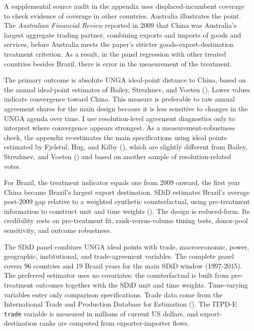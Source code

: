 \documentclass[
  12pt,
]{article}
\begin{document}
A supplemental source audit in the appendix uses displaced-incumbent coverage to check evidence of coverage in other countries. Australia illustrates the point. The \emph{Australian Financial Review} reported in 2009 that China was Australia's largest aggregate trading partner, combining exports and imports of goods and services, before Australia meets the paper's stricter goods-export-destination treatment criterion. As a result, in the panel regression with other treated countries besides Brazil, there is error in the measurement of the treatment.

The primary outcome is absolute UNGA ideal-point distance to China, based on the annual ideal-point estimates of Bailey, Strezhnev, and Voeten (). Lower values indicate convergence toward China. This measure is preferable to raw annual agreement shares for the main design because it is less sensitive to changes in the UNGA agenda over time. I use resolution-level agreement diagnostics only to interpret where convergence appears strongest. As a measurement-robustness check, the appendix re-estimates the main specifications using ideal points estimated by Fjelstul, Hug, and Kilby (), which are slightly different from Bailey, Strezhnev, and Voeten () and based on another sample of resolution-related votes.

For Brazil, the treatment indicator equals one from 2009 onward, the first year China became Brazil's largest export destination. SDiD estimates Brazil's average post-2009 gap relative to a weighted synthetic counterfactual, using pre-treatment information to construct unit and time weights (). The design is reduced-form. Its credibility rests on pre-treatment fit, rank-versus-volume timing tests, donor-pool sensitivity, and outcome robustness.

The SDiD panel combines UNGA ideal points with trade, macroeconomic, power, geographic, institutional, and trade-agreement variables. The complete panel covers 96 countries and 19 Brazil years for the main SDiD window (1997-2015). The preferred estimator uses no covariates: the counterfactual is built from pre-treatment outcomes together with the SDiD unit and time weights. Time-varying variables enter only comparison specifications. Trade data come from the International Trade and Production Database for Estimation (). The ITPD-E \texttt{trade} variable is measured in millions of current US dollars, and export-destination ranks are computed from exporter-importer flows.
\end{document}
